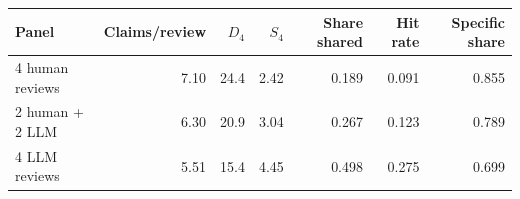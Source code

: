 \begin{tabular}{lrrrrrr}
\toprule
Panel & Claims/review & $D_4$ & $S_4$ & Share shared & Hit rate & Specific share \\
\midrule
4 human reviews & 7.10 & 24.4 & 2.42 & 0.189 & 0.091 & 0.855 \\
2 human + 2 LLM & 6.30 & 20.9 & 3.04 & 0.267 & 0.123 & 0.789 \\
4 LLM reviews & 5.51 & 15.4 & 4.45 & 0.498 & 0.275 & 0.699 \\
\bottomrule
\end{tabular}
